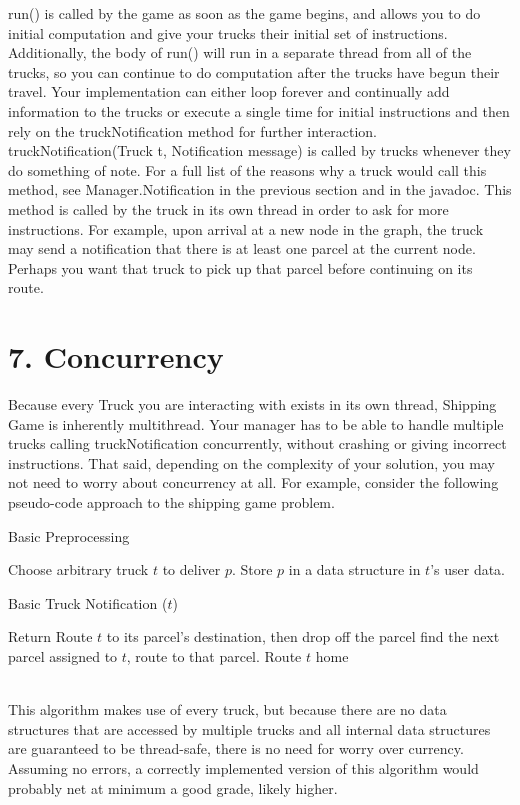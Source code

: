 \documentclass[11pt]{article}
\begin{document}
run() is called by the game as soon as the game begins, and allows you to do
initial computation and give your trucks their initial set of instructions.
Additionally, the body of run() will run in a separate thread from all of the
trucks, so you can continue to do computation after the trucks have begun their
travel. Your implementation can either loop forever and continually add
information to the trucks or execute a single time for initial instructions and
then rely on the truckNotification method for further interaction.\\

truckNotification(Truck t, Notification message) is called by trucks whenever
they do something of note. For a full list of the reasons why a truck would call
this method, see Manager.Notification in the previous section and in the
javadoc. This method is called by the truck in its own thread in order to ask
for more instructions. For example, upon arrival at a new node in the graph, the
truck may send a notification that there is at least one parcel at the current
node. Perhaps you want that truck to pick up that parcel before continuing on
its route.

\newpage
\section{7. Concurrency}
Because every Truck you are interacting with exists in its own thread, Shipping
Game is inherently multithread. Your manager has to be able to handle multiple
trucks calling truckNotification concurrently, without crashing or giving
incorrect instructions. That said, depending on the complexity of your solution,
you may not need to worry about concurrency at all. For example, consider the
following pseudo-code approach to the shipping game problem.
\begin{algorithm}
\caption{Basic Preprocessing} \label{alg:ls}
\begin{algorithmic}[1]
\STATE Choose arbitrary truck $t$ to deliver $p$. Store $p$ in a data structure
in $t$'s user data.
\ENDFOR
\end{algorithmic}
\end{algorithm}
\begin{algorithm}
\caption{Basic Truck Notification ($t$)} \label{alg:ls}
\begin{algorithmic}[1]
\STATE Return
\ENDIF
{}
\STATE Route $t$ to its parcel's destination, then drop off the parcel
\ELSE
\STATE find the next parcel assigned to $t$, route to that parcel.
\ENDIF
\ELSE
\STATE Route $t$ home
\ENDIF
\end{algorithmic}
\end{algorithm}
\\This algorithm makes use of every truck, but because there are no data
structures that are accessed by multiple trucks and all internal data structures
are guaranteed to be thread-safe, there is no need for worry over currency.
Assuming no errors, a correctly implemented version of this algorithm  would
probably net at minimum a good grade, likely higher.\\
\end{document}
